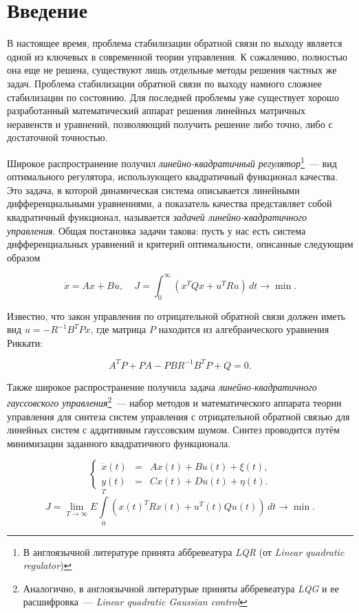 \chapter*{Введение}

В настоящее время, проблема стабилизации обратной связи по выходу является одной из ключевых в современной теории управления. К сожалению, полностью она еще не решена, существуют лишь отдельные методы решения частных же задач. Проблема стабилизации обратной связи по выходу намного сложнее стабилизации по состоянию. Для последней проблемы уже существует хорошо разработанный математический аппарат\cite{BOYD} решения линейных матричных неравенств и уравнений, позволяющий получить решение либо точно, либо с достаточной точностью.

Широкое распространение получил \emph{линейно-квадратичный регулятор}\footnote{В англоязычной литературе принята аббревеатура \emph{LQR} (от \emph{Linear quadratic regulator\/})}~--- вид оптимального регулятора, использующего квадратичный функционал качества. Это задача, в которой динамическая система описывается линейными дифференциальными уравнениями, а показатель качества представляет собой квадратичный функционал, называется \emph{задачей линейно-квадратичного управления\/}. Общая постановка задачи такова: пусть у нас есть система дифференциальных уравнений и критерий оптимальности, описанные следующим образом

$$
\dot{x}=Ax+Bu{,}~~~~~J=\int_0^\infty \left( x^TQx + u^TRu \right)\,dt \longrightarrow \min\mbox{.}
$$

Известно\cite{BOYD}, что закон управления по отрицательной обратной связи должен иметь вид $u=-R^{-1}B^TPx$, где матрица $P$ находится из алгебраического уравнения Риккати:

$$
A^TP + PA - PBR^{-1}B^TP + Q = 0\mbox{.}
$$

Также широкое распространение получила задача \emph{линейно-квадратичного гауссовского управления}\footnote{Аналогично, в англоязычной литературые приняты аббревеатура \emph{LQG} и ее расшифровка~--- \emph{Linear quadratic Gaussian control}}~--- набор методов и математического аппарата теории управления для синтеза систем управления с отрицательной обратной связью для линейных систем с аддитивным гауссовским шумом. Синтез проводится путём минимизации заданного квадратичного функционала.

\begin{displaymath}
\left\{ \begin{array}{lcr}
         \dot{x}(t)& = & Ax(t) + Bu(t) + \xi(t)\mbox{,} \\
         y(t)& = &Cx(t) + Du(t) + \eta(t)\mbox{.}
        \end{array} \right.
\end{displaymath}
$$
J = \lim\limits_{T \to \infty} E \int\limits_0^T \left( x(t)^TRx(t) + u^T(t)Qu(t) \right)\,dt \longrightarrow \min\mbox{.}
$$

